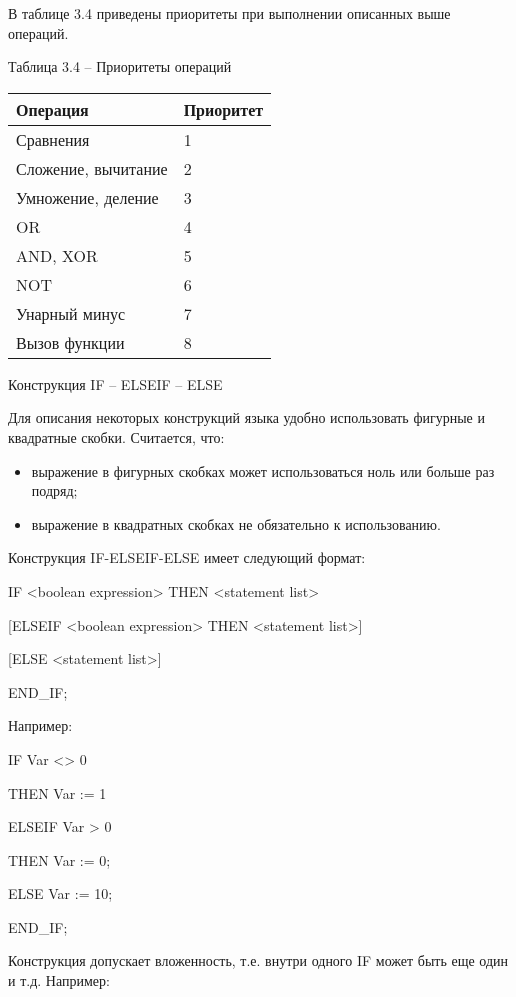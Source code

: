 \documentclass[letterpaper,10pt,russian]{sphinxmanual}
\begin{document}
В таблице 3.4 приведены приоритеты при выполнении описанных выше
операций.

Таблица 3.4 – Приоритеты операций

\noindent\begin{tabulary}{\linewidth}{|L|L|}
\hline

Операция
&
Приоритет
\\
\hline
Сравнения
&
1
\\
\hline
Сложение, вычитание
&
2
\\
\hline
Умножение, деление
&
3
\\
\hline
OR
&
4
\\
\hline
AND, XOR
&
5
\\
\hline
NOT
&
6
\\
\hline
Унарный минус
&
7
\\
\hline
Вызов функции
&
8
\\
\hline\end{tabulary}


Конструкция IF – ELSEIF – ELSE

Для описания некоторых конструкций языка удобно использовать фигурные и
квадратные скобки. Считается, что:
\begin{itemize}
\item {} 
выражение в фигурных скобках может использоваться ноль или больше раз
подряд;

\item {} 
выражение в квадратных скобках не обязательно к использованию.

\end{itemize}

Конструкция IF-ELSEIF-ELSE имеет следующий формат:

IF \textless{}boolean expression\textgreater{} THEN \textless{}statement list\textgreater{}

{[}ELSEIF \textless{}boolean expression\textgreater{} THEN \textless{}statement list\textgreater{}{]}

{[}ELSE \textless{}statement list\textgreater{}{]}

END\_IF;

Например:

IF Var \textless{}\textgreater{} 0

THEN Var := 1

ELSEIF Var \textgreater{} 0

THEN Var := 0;

ELSE Var := 10;

END\_IF;

Конструкция допускает вложенность, т.е. внутри одного IF может быть еще
один и т.д. Например:
\end{document}

